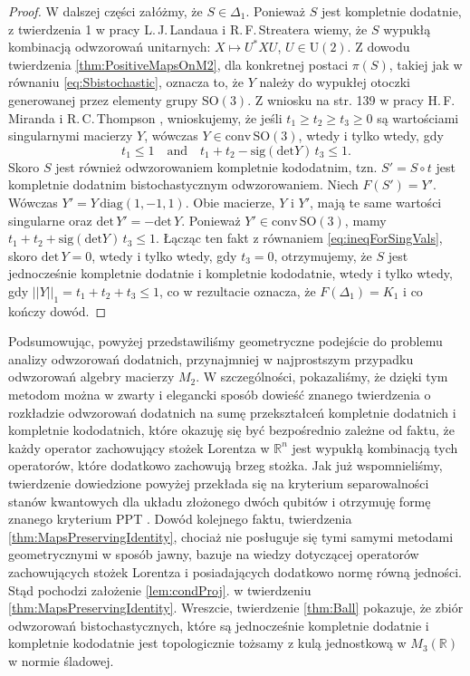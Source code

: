 {\begin{proof}
W dalszej części załóżmy, że $S \in \Delta_{1}$.
Ponieważ $S$ jest kompletnie dodatnie,
z twierdzenia 1 w pracy L.\,J.\,Landaua i R.\,F.\,Streatera
\cite{landau1993birkhoff} wiemy, że
$S$ wypukłą kombinacją odwzorowań unitarnych:
$X \mapsto U^{*} X U$, $U \in \text{U}(2)$.
Z dowodu twierdzenia \ref{thm:PositiveMapsOnM2},
dla konkretnej postaci $\pi(S)$, takiej jak w równaniu \eqref{eq:Sbistochastic},
oznacza to, że $Y$ należy do wypukłej otoczki generowanej przez elementy grupy $\text{SO}(3)$.
Z  wniosku na str. 139 w pracy H.\,F.\,Miranda i R.\,C.\,Thompson
\cite{miranda1994group},
wnioskujemy, że jeśli $t_{1} \geq t_{2} \geq t_{3} \geq 0$
są wartościami singularnymi macierzy $Y$,
wówczas $Y \in \text{conv} \, \text{SO}(3)$,
wtedy i tylko wtedy, gdy
\begin{equation}
\label{eq:ineqForSingVals}
t_{1} \leq 1
\quad \text{and} \quad
t_{1} + t_{2} - \text{sig} (\text{det} Y) \, t_{3} \leq 1.
\end{equation}
Skoro $S$ jest również odwzorowaniem kompletnie kododatnim, tzn.
$S' = S \circ t$ jest kompletnie dodatnim bistochastycznym odwzorowaniem.
Niech $F(S') = Y'$.
Wówczas $Y' = Y \, \text{diag} (1,-1,1)$.
Obie macierze, $Y$ i $Y'$, mają te same wartości singularne oraz
$\text{det} \, Y' = - \text{det} \, Y$.
Ponieważ $Y' \in  \text{conv} \, \text{SO}(3)$, mamy
$t_{1} + t_{2} + \text{sig} (\text{det} Y) \, t_{3} \leq 1$.
Łącząc ten fakt z równaniem \eqref{eq:ineqForSingVals},
skoro $\text{det} \, Y = 0$, wtedy i tylko wtedy, gdy  $t_{3} = 0$,
otrzymujemy, że $S$ jest jednocześnie kompletnie dodatnie i kompletnie kododatnie,
wtedy i tylko wtedy, gdy
$||Y||_{1} = t_{1} + t_{2} + t_{3} \leq 1$,
co w rezultacie oznacza, że $F(\Delta_{1}) = K_{1}$
i co kończy dowód.
\end{proof}

Podsumowując, powyżej przedstawiliśmy geometryczne podejście do problemu
analizy odwzorowań dodatnich, przynajmniej w najprostszym przypadku odwzorowań
algebry macierzy $M_{2}$.
W szczególności,
pokazaliśmy, że dzięki tym metodom można w zwarty i elegancki sposób dowieść
znanego twierdzenia o rozkładzie odwzorowań dodatnich na sumę przekształceń
kompletnie dodatnich i kompletnie kododatnich,
które okazuję się być bezpośrednio zależne od faktu, że każdy operator
zachowujący stożek Lorentza w $\mathbb{R}^{n}$ jest wypukłą kombinacją tych
operatorów, które dodatkowo zachowują brzeg stożka.
Jak już wspomnieliśmy, twierdzenie dowiedzione powyżej
przekłada się na kryterium separowalności stanów kwantowych dla układu
złożonego dwóch qubitów i otrzymuję formę znanego kryterium PPT
\cite{peres1996separability,horodecki1996separability}.
Dowód kolejnego faktu, twierdzenia \ref{thm:MapsPreservingIdentity},
chociaż nie posługuje się tymi samymi metodami geometrycznymi w sposób jawny,
bazuje na wiedzy dotyczącej operatorów zachowujących stożek Lorentza i posiadających
dodatkowo normę równą jedności.
Stąd pochodzi założenie \ref{lem:condProj}. w twierdzeniu \ref{thm:MapsPreservingIdentity}.
Wreszcie, twierdzenie \ref{thm:Ball} pokazuje, że zbiór odwzorowań bistochastycznych,
które są jednocześnie kompletnie dodatnie i kompletnie kododatnie jest
topologicznie tożsamy z kulą jednostkową w $M_{3}(\mathbb{R})$ w normie śladowej.


}
